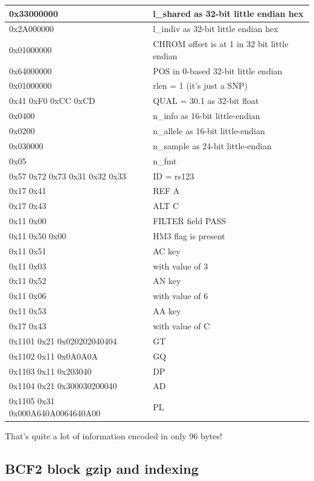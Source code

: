 \documentclass[8pt]{article}
\begin{document}
\vspace{0.3cm}
\begin{tabular}{|l| l|} \hline
0x33000000 & l\_shared as 32-bit little endian hex \\ \hline
0x2A000000 & l\_indiv as 32-bit little endian hex \\ \hline
0x01000000 & CHROM offset is at 1 in 32 bit little endian \\ \hline
0x64000000 & POS in 0-based 32-bit little endian \\ \hline
0x01000000 & rlen = 1 (it's just a SNP) \\ \hline
0x41 0xF0 0xCC 0xCD & QUAL = 30.1 as 32-bit float \\ \hline
0x0400     & n\_info as 16-bit little-endian \\ \hline
0x0200     & n\_allele as 16-bit little-endian \\ \hline
0x030000   & n\_sample as 24-bit little-endian \\ \hline
0x05       & n\_fmt \\ \hline
0x57 0x72 0x73 0x31 0x32 0x33 & ID = rs123 \\ \hline
0x17 0x41 & REF A \\ \hline
0x17 0x43 & ALT C \\ \hline
0x11 0x00 & FILTER field PASS \\ \hline
0x11 0x50 0x00 & HM3 flag is present \\ \hline
0x11 0x51 & AC key \\ \hline
0x11 0x03 & with value of 3 \\ \hline
0x11 0x52 & AN key \\ \hline
0x11 0x06 & with value of 6 \\ \hline
0x11 0x53 & AA key \\ \hline
0x17 0x43 & with value of C \\ \hline
0x1101 0x21 0x020202040404 & GT \\ \hline
0x1102 0x11 0x0A0A0A & GQ \\ \hline
0x1103 0x11 0x203040 & DP \\ \hline
0x1104 0x21 0x300030200040 & AD \\ \hline
0x1105 0x31 0x000A640A0064640A00 & PL \\ \hline
\end{tabular}
\vspace{0.3cm}

That's quite a lot of information encoded in only 96 bytes!

\subsection{BCF2 block gzip and indexing}
\end{document}
